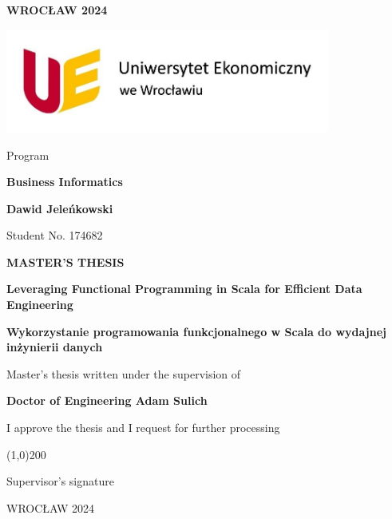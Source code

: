 \begin{titlepage}
\begin{center}
\textbf{WROCŁAW 2024}

\vspace{0cm}
\includegraphics[width=0.8\textwidth]{images/uewroc.jpg}

\vspace{0cm}
Program

\textbf{Business Informatics}

\vspace{0cm}
{\Large \textbf{Dawid Jeleńkowski}}

Student No. 174682

\vspace{1cm}
\textbf{MASTER’S THESIS}

\vspace{1cm}
{\huge \textbf{Leveraging Functional Programming in Scala for Efficient Data Engineering}}

\textbf{Wykorzystanie programowania funkcjonalnego w Scala do wydajnej inżynierii danych}

\vspace{2cm}
Master’s thesis written under the supervision of

{\Large \textbf{Doctor of Engineering Adam Sulich}}

\vspace{1cm}
I approve the thesis and I request for further processing

\vspace{0cm}
\line(1,0){200}

Supervisor’s signature

\vspace{0cm}
WROCŁAW 2024
\end{center}
\end{titlepage}